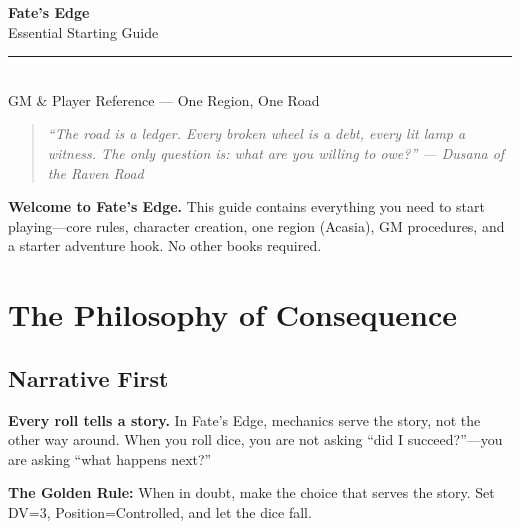 \documentclass[10pt]{article}
\begin{document}

\begin{center}
    {\Huge\bfseries\sffamily\color{edgered} Fate's Edge}\\[0.2em]
    {\large\sffamily Essential Starting Guide}\\[0.5em]
    \rule{0.7\textwidth}{0.5pt}\\[0.8em]
    {\large\sffamily GM \& Player Reference — One Region, One Road}\\[1em]
    \begin{quote}
        \itshape ``The road is a ledger. Every broken wheel is a debt, every lit lamp a witness. The only question is: what are you willing to owe?''
        \hfill — Dusana of the Raven Road
    \end{quote}
    \begin{sidebar}
        \textbf{Welcome to Fate's Edge.} This guide contains everything you need to start playing—core rules, character creation, one region (Acasia), GM procedures, and a starter adventure hook. No other books required.
    \end{sidebar}
\end{center}

\vspace{1em}
\twocolumn

\section{The Philosophy of Consequence}

\subsection{Narrative First}
\textbf{Every roll tells a story.} In Fate's Edge, mechanics serve the story, not the other way around. When you roll dice, you are not asking ``did I succeed?''—you are asking ``what happens next?''

\begin{sidebar}
    \textbf{The Golden Rule:} When in doubt, make the choice that serves the story. Set DV=3, Position=Controlled, and let the dice fall.
\end{sidebar}
\end{document}
